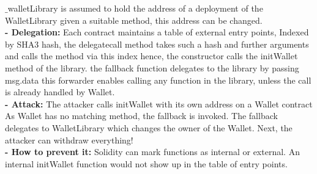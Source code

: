 \documentclass{article}
\begin{document}
$\_$walletLibrary is assumed to hold the address of a deployment of the WalletLibrary given a suitable method, this address can be changed. \\
\textbf{- Delegation: }Each contract maintains a table of external entry points, Indexed by SHA3 hash, the delegatecall method takes such a hash and further arguments and calls the method via this index hence, the constructor calls the initWallet method of the library. the fallback function delegates to the library by passing msg.data this forwarder enables calling any function in the library, unless the call is already handled by Wallet.\\
\textbf{- Attack: }The attacker calls initWallet with its own address on a Wallet contract
As Wallet has no matching method, the fallback is invoked. The fallback delegates to WalletLibrary which changes the owner of the Wallet. Next, the attacker can withdraw everything!\\
\textbf{- How to prevent it: }Solidity can mark functions as internal or external. An internal initWallet function would not show up in the table of entry points.
\end{document}
